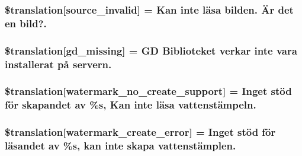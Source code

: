 \subsubsection[{\$translation}]{\setlength{\rightskip}{0pt plus 5cm}\$translation\mbox{[}\textquotesingle{}source\+\_\+invalid\textquotesingle{}\mbox{]} = \textquotesingle{}Kan inte läsa bilden. Är det en bild?.\textquotesingle{}}\label{class_8upload_8sv___s_e_8php_a6ab0a660b457eaf2d3434b225449fdd6}
\hypertarget{class_8upload_8sv___s_e_8php_a7f3dfcc0db4bbc0f2e7210c439798e56}{}
\subsubsection[{\$translation}]{\setlength{\rightskip}{0pt plus 5cm}\$translation\mbox{[}\textquotesingle{}gd\+\_\+missing\textquotesingle{}\mbox{]} = \textquotesingle{}G\+D Biblioteket verkar inte vara installerat på servern.\textquotesingle{}}\label{class_8upload_8sv___s_e_8php_a7f3dfcc0db4bbc0f2e7210c439798e56}
\hypertarget{class_8upload_8sv___s_e_8php_a82d5853430ab72dc1f9799ec36144cc6}{}
\subsubsection[{\$translation}]{\setlength{\rightskip}{0pt plus 5cm}\$translation\mbox{[}\textquotesingle{}watermark\+\_\+no\+\_\+create\+\_\+support\textquotesingle{}\mbox{]} = \textquotesingle{}Inget stöd för skapandet av \%s, Kan inte läsa vattenstämpeln.\textquotesingle{}}\label{class_8upload_8sv___s_e_8php_a82d5853430ab72dc1f9799ec36144cc6}
\hypertarget{class_8upload_8sv___s_e_8php_aabca0b65dadbc6184415c16375f284ca}{}
\subsubsection[{\$translation}]{\setlength{\rightskip}{0pt plus 5cm}\$translation\mbox{[}\textquotesingle{}watermark\+\_\+create\+\_\+error\textquotesingle{}\mbox{]} = \textquotesingle{}Inget stöd för läsandet av \%s, kan inte skapa vattenstämplen.\textquotesingle{}}\label{class_8upload_8sv___s_e_8php_aabca0b65dadbc6184415c16375f284ca}
\hypertarget{class_8upload_8sv___s_e_8php_ac336e7a5701e47ba4a05e9e498a3cc44}{}
